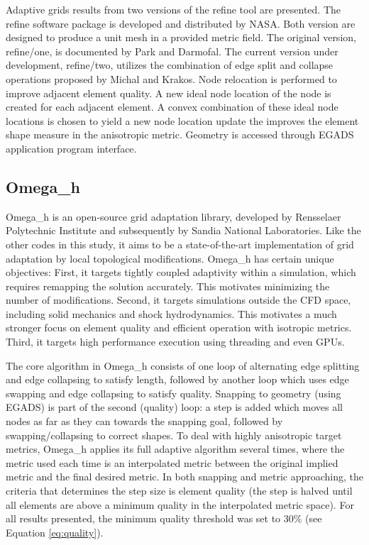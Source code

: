 \documentclass[3p,times,procedia,number]{elsarticle}
\begin{document}
Adaptive grids results from two versions of the refine tool are presented.
The refine software package is developed and distributed by NASA.
Both version are designed to produce a
unit mesh\cite{loseille-alauzet-siamjna-2011-cont-mesh-framework-1}
in a provided metric field.
The original version, refine/one, is documented
by Park and Darmofal.\cite{park-darmofal-parallel-aniso-adapt-aiaa}
The current version under development, refine/two,
utilizes the combination of edge split and collapse operations
proposed by Michal and Krakos.\cite{michal-krakos-aniso-adapt-edge}
Node relocation is performed to improve adjacent element quality.
A new ideal node location of the node is created
for each adjacent element.
A convex combination of these ideal node locations is chosen
to yield a new node location update the improves
the element shape measure in the anisotropic
metric.\cite{alauzet-topology-moving-mesh}
Geometry is accessed through EGADS
application program interface.

\subsection{Omega\_h}

Omega\_h is an open-source grid adaptation library,%
\cite{ibanez-phd-thesis-heterogeneous-adapt,%
ibanez-shephard-moving-shared-mem,%
omega_h-website} developed by Rensselaer Polytechnic Institute
and subsequently by Sandia National Laboratories.
Like the other codes in this study, it aims to be a state-of-the-art
implementation of grid adaptation by local topological modifications.
Omega\_h has certain unique objectives:
First, it targets tightly coupled adaptivity within a simulation,
which requires remapping the solution accurately.
This motivates minimizing the number of modifications.
Second, it targets simulations outside the CFD space, including
solid mechanics and shock hydrodynamics.
This motivates a much stronger focus on element quality
and efficient operation with isotropic metrics.
Third, it targets high performance execution using threading
and even GPUs.

The core algorithm in Omega\_h consists of one loop of alternating
edge splitting and edge collapsing to satisfy length, followed by another loop
which uses edge swapping and edge collapsing to satisfy quality.
Snapping to geometry (using EGADS) is part of the second (quality) loop:
a step is added which moves all nodes as far as they can towards
the snapping goal, followed by swapping/collapsing to correct shapes.
To deal with highly anisotropic target metrics, Omega\_h applies
its full adaptive algorithm several times, where the metric used
each time is an interpolated metric between the original implied metric
and the final desired metric.
In both snapping and metric approaching, the criteria that determines
the step size is element quality (the step is halved until all elements
are above a minimum quality in the interpolated metric space).
For all results presented, the minimum quality threshold was set to 30\%
(see Equation \ref{eq:quality}).
\end{document}

